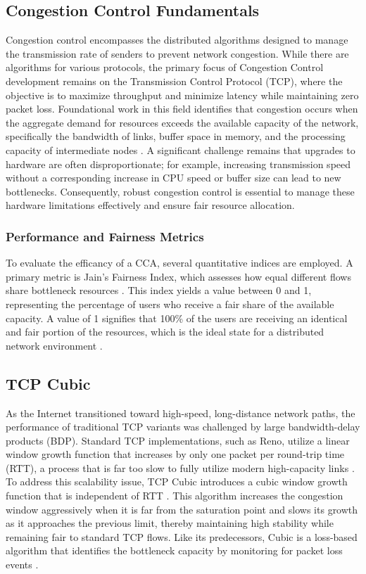 \documentclass[conference]{IEEEtran}
\begin{document}
\subsection{Congestion Control Fundamentals}

Congestion control encompasses the distributed algorithms designed to manage the transmission rate of senders to prevent network congestion. 
While there are algorithms for various protocols, the primary focus of Congestion Control development remains on the Transmission Control Protocol (TCP), where the objective is to maximize throughput and minimize latency while maintaining zero packet loss. 
Foundational work in this field identifies that congestion occurs when the aggregate demand for resources exceeds the available capacity of the network, specifically the bandwidth of links, buffer space in memory, and the processing capacity of intermediate nodes \cite{JainsCongestionControl}. 
A significant challenge remains that upgrades to hardware are often disproportionate; for example, increasing transmission speed without a corresponding increase in CPU speed or buffer size can lead to new bottlenecks. 
Consequently, robust congestion control is essential to manage these hardware limitations effectively and ensure fair resource allocation.

\subsubsection{Performance and Fairness Metrics}

To evaluate the efficancy of a \acs{CCA}, several quantitative indices are employed. 
A primary metric is Jain's Fairness Index, which assesses how equal different flows share bottleneck resources \cite{JainsIndex}. 
This index yields a value between 0 and 1, representing the percentage of users who receive a fair share of the available capacity.
A value of 1 signifies that 100\% of the users are receiving an identical and fair portion of the resources, which is the ideal state for a distributed network environment \cite{JainsIndex}.

\subsection{TCP Cubic}

As the Internet transitioned toward high-speed, long-distance network paths, the performance of traditional TCP variants was challenged by large bandwidth-delay products (BDP). 
Standard TCP implementations, such as Reno, utilize a linear window growth function that increases by only one packet per round-trip time (RTT), a process that is far too slow to fully utilize modern high-capacity links \cite{TCPCUBIC}. 
To address this scalability issue, TCP Cubic introduces a cubic window growth function that is independent of RTT \cite{TCPCUBIC}. 
This algorithm increases the congestion window aggressively when it is far from the saturation point and slows its growth as it approaches the previous limit, thereby maintaining high stability while remaining fair to standard TCP flows. 
Like its predecessors, Cubic is a loss-based algorithm that identifies the bottleneck capacity by monitoring for packet loss events \cite{TCPCUBIC}.
\end{document}
